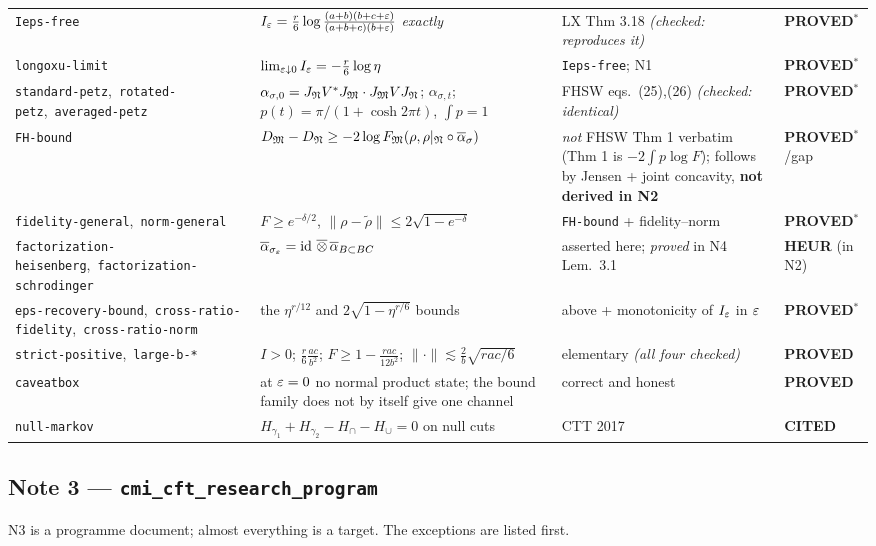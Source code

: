 \documentclass[11pt]{article}
\newcommand{\stPR}{{\color{okgreen}\textsf{\scriptsize\bfseries PROVED}}}
\newcommand{\stPMC}{{\color{teal}\textsf{\scriptsize\bfseries PROVED$^\ast$}}}
\newcommand{\stCIT}{{\color{navy}\textsf{\scriptsize\bfseries CITED}}}
\newcommand{\stHEU}{{\color{warn}\textsf{\scriptsize\bfseries HEUR}}}
\newcommand{\NI}{N1}\newcommand{\NII}{N2}\newcommand{\NIII}{N3}
\newcommand{\NIV}{N4}\newcommand{\NV}{N5}\newcommand{\NVI}{N6}\newcommand{\NVII}{N7}
\newcommand{\CMI}{I}
\newcommand{\id}{\operatorname{id}}
\begin{document}
{\begin{tabularx}{\textwidth}{L{0.150\textwidth} X L{0.215\textwidth} L{0.098\textwidth}}
\texttt{Ieps-free} & $\CMI_\eps=\frac r6\log\frac{(a+b)(b+c+\eps)}{(a+b+c)(b+\eps)}$ \emph{exactly} & LX Thm 3.18 \emph{(checked: reproduces it)} & \stPMC \\
\texttt{longoxu-limit} & $\lim_{\eps\downarrow0}\CMI_\eps=-\frac r6\log\eta$ & \texttt{Ieps-free}; \NI & \stPMC \\
\texttt{standard-petz},\allowbreak\ \texttt{rotated-petz},\allowbreak\ \texttt{averaged-petz} & $\alpha_{\sigma,0}=J_\mathfrak N V^*J_\mathfrak M\cdot J_\mathfrak M VJ_\mathfrak N$; $\alpha_{\sigma,t}$; $p(t)=\pi/(1{+}\cosh2\pi t)$, $\int p=1$ & FHSW eqs.~(25),(26) \emph{(checked: identical)} & \stPMC \\
\texttt{FH-bound} & $D_\mathfrak M-D_\mathfrak N\ge-2\log F_\mathfrak M(\rho,\rho|_\mathfrak N\circ\overline\alpha_\sigma)$ & \emph{not} FHSW Thm 1 verbatim (Thm 1 is $-2\!\int\! p\log F$); follows by Jensen + joint concavity, \textbf{not derived in \NII} & \stPMC{}/gap \\
\texttt{fidelity-\allowbreak general},\allowbreak\ \texttt{norm-general} & $F\ge e^{-\delta/2}$, $\|\rho-\tilde\rho\|\le2\sqrt{1-e^{-\delta}}$ & \texttt{FH-bound} + fidelity--norm & \stPMC \\
\texttt{factorization-\allowbreak heisenberg},\allowbreak\ \texttt{factorization-\allowbreak schrodinger} & $\overline\alpha_{\sigma_\eps}=\id\,\overline\otimes\,\overline\alpha_{B\subset BC}$ & asserted here; \emph{proved} in \NIV{} Lem.~3.1 & \stHEU{} (in \NII) \\
\texttt{eps-\allowbreak recovery-\allowbreak bound},\allowbreak\ \texttt{cross-\allowbreak ratio-\allowbreak fidelity},\allowbreak\ \texttt{cross-\allowbreak ratio-\allowbreak norm} & the $\eta^{r/12}$ and $2\sqrt{1-\eta^{r/6}}$ bounds & above + monotonicity of $\CMI_\eps$ in $\varepsilon$ & \stPMC \\
\texttt{strict-\allowbreak positive},\allowbreak\ \texttt{large-b-*} & $\CMI>0$; $\frac r6\frac{ac}{b^2}$; $F\ge1-\frac{rac}{12b^2}$; $\|\cdot\|\lesssim\frac2b\sqrt{rac/6}$ & elementary \emph{(all four checked)} & \stPR \\
\texttt{caveatbox} & at $\varepsilon=0$ no normal product state; the bound family does not by itself give one channel & correct and honest & \stPR \\
\texttt{null-markov} & $H_{\gamma_1}{+}H_{\gamma_2}{-}H_\cap{-}H_\cup=0$ on null cuts & CTT 2017 & \stCIT \\
\bottomrule
\end{tabularx}}

\subsection{Note 3 --- \texttt{cmi\_cft\_research\_program}}
\NIII{} is a programme document; almost everything is a target.  The exceptions are listed first.
\end{document}
